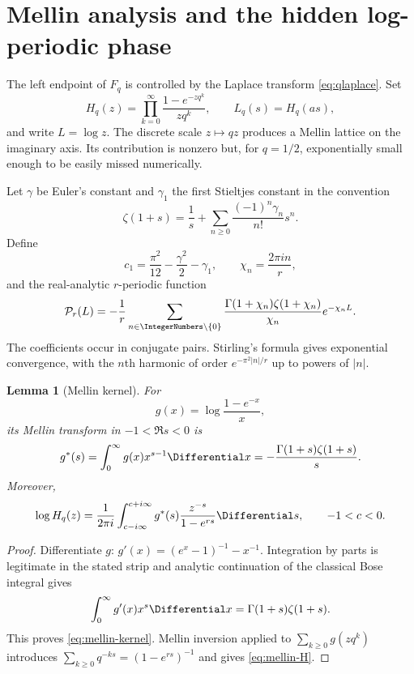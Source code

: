 \documentclass[11pt,oneside]{article}
\newtheorem{lemma}[theorem]{Lemma}
\theoremstyle{definition}
\theoremstyle{remark}
\newcommand{\cP}{\mathcal P}
\begin{document}
\section{Mellin analysis and the hidden log-periodic phase}
\label{sec:mellin}

The left endpoint of $F_q$ is controlled by the Laplace transform
\eqref{eq:qlaplace}.  Set
\begin{equation}
 H_q(z)=\prod_{k=0}^{\infty}\frac{1-e^{-zq^k}}{zq^k},
 \qquad L_q(s)=H_q(as),
 \label{eq:Hq}
\end{equation}
and write $L=\log z$.  The discrete scale $z\mapsto qz$ produces a Mellin lattice on
the imaginary axis.  Its contribution is nonzero but, for $q=1/2$, exponentially
small enough to be easily missed numerically.

Let $\gamma$ be Euler's constant and $\gamma_1$ the first Stieltjes constant in the
convention
\[
 \zeta(1+s)=\frac1s+\sum_{n\ge0}\frac{(-1)^n\gamma_n}{n!}s^n.
\]
Define
\begin{equation}
 c_1=\frac{\pi^2}{12}-\frac{\gamma^2}{2}-\gamma_1,
 \qquad
 \chi_n=\frac{2\pi in}{r},
 \label{eq:c1-chi}
\end{equation}
and the real-analytic $r$-periodic function
\begin{equation}
 \cP_r(L)=
 -\frac1r\sum_{n\in\IntegerNumbers\setminus\{0\}}
 \frac{\Gamma(1+\chi_n)\zeta(1+\chi_n)}{\chi_n}
 e^{-\chi_nL}.
 \label{eq:periodic-P}
\end{equation}
The coefficients occur in conjugate pairs.  Stirling's formula gives exponential
convergence, with the $n$th harmonic of order
$e^{-\pi^2|n|/r}$ up to powers of $|n|$.

\begin{lemma}[Mellin kernel]
For
\[
 g(x)=\log\frac{1-e^{-x}}x,
\]
its Mellin transform in $-1<\Re s<0$ is
\begin{equation}
 g^*(s)=\int_0^\infty g(x)x^{s-1}\Differential x
 =-\frac{\Gamma(1+s)\zeta(1+s)}s.
 \label{eq:mellin-kernel}
\end{equation}
Moreover,
\begin{equation}
 \log H_q(z)=\frac1{2\pi i}\int_{c-i\infty}^{c+i\infty}
 g^*(s)\frac{z^{-s}}{1-e^{rs}}\Differential s,
 \qquad -1<c<0.
 \label{eq:mellin-H}
\end{equation}
\end{lemma}

\begin{proof}
Differentiate $g$:
$g'(x)=(e^x-1)^{-1}-x^{-1}$.  Integration by parts is legitimate in the stated
strip and analytic continuation of the classical Bose integral gives
\[
 \int_0^\infty g'(x)x^s\Differential x=\Gamma(1+s)\zeta(1+s).
\]
This proves \eqref{eq:mellin-kernel}.  Mellin inversion applied to
$\sum_{k\ge0}g(zq^k)$ introduces
$\sum_{k\ge0}q^{-ks}=(1-e^{rs})^{-1}$ and gives \eqref{eq:mellin-H}.
\end{proof}
\end{document}
